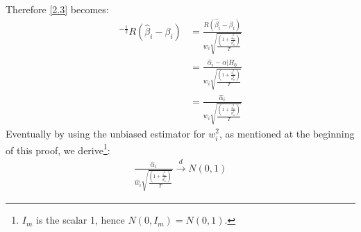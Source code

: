 \documentclass[]{article}
\begin{document}
Therefore \ref{2.3} becomes:
\begin{align*}
	[RV(\beta_i)R']^{-\frac{1}{2}}R(\hat{\beta}_i-\beta_i) &= \frac{R(\hat{\beta}_i-\beta_i)}{w_i\sqrt{\frac{(1 + \frac{\overline{z}_m^2}{\hat{\sigma}_{m}^2})}{T}}} \\
	&= \frac{\hat{\alpha}_i - \alpha|H_0}{w_i\sqrt{\frac{(1 + \frac{\overline{z}_m^2}{\hat{\sigma}_{m}^2})}{T}}} \\
	&= \frac{\hat{\alpha}_i}{w_i\sqrt{\frac{(1 + \frac{\overline{z}_m^2}{\hat{\sigma}_{m}^2})}{T}}}
\end{align*}
Eventually by using the unbiased estimator for $w_i^2$, as mentioned at the beginning of this proof, we derive\footnote{$I_m$ is the scalar 1, hence $N(0,I_m) = N(0,1)$.}: 
\begin{align}
	\frac{\hat{\alpha}_i}{\hat{w}_i\sqrt{\frac{(1 + \frac{\overline{z}_m^2}{\hat{\sigma}_{m}^2})}{T}}} \overset{d}{\to} N(0,1)
\end{align}
\end{document}
